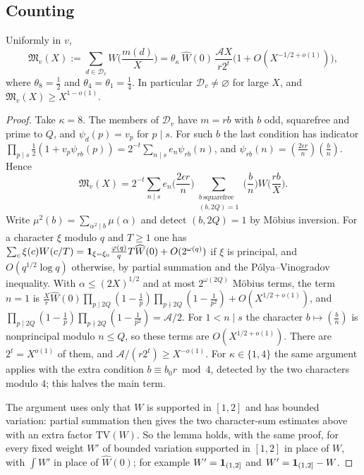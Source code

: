 \documentclass[11pt,colorlinks]{charlie}
\newcommand{\cD}{\mathcal{D}}
\newcommand{\cA}{\mathcal{A}}
\begin{document}
\subsection{Counting}
\begin{lemma}\label{lem:mass}
Uniformly in $v$,
\[
 \mathfrak M_v(X):=\sum_{d\in\cD_v}W\Big(\frac{m(d)}X\Big)=\theta_\kappa\,\widehat W(0)\,\frac{\cA X}{r2^t}\big(1+O(X^{-1/2+o(1)})\big),
\]
where $\theta_8=\frac12$ and $\theta_4=\theta_1=\frac14$.
In particular $\cD_v\ne\varnothing$ for large $X$, and $\mathfrak M_v(X)\ge X^{1-o(1)}$.
\end{lemma}
\begin{proof}
Take $\kappa=8$. The members of $\cD_v$ have $m=rb$ with $b$ odd, squarefree and prime to $Q$, and $\psi_d(p)=v_p$ for $p\mid s$. For such $b$ the last condition has indicator $\prod_{p\mid s}\tfrac12(1+v_p\psi_{rb}(p))=2^{-t}\sum_{n\mid s}e_n\psi_{rb}(n)$, and $\psi_{rb}(n)=(\tfrac{2\epsilon r}{n})(\tfrac bn)$. Hence
\[
 \mathfrak M_v(X)=2^{-t}\sum_{n\mid s}e_n\Big(\frac{2\epsilon r}n\Big)\sum_{\substack{b\ \text{squarefree}\\(b,2Q)=1}}\Big(\frac bn\Big)W\Big(\frac{rb}X\Big).
\]
Write $\mu^2(b)=\sum_{\alpha^2\mid b}\mu(\alpha)$ and detect $(b,2Q)=1$ by M\"obius inversion. For a character $\xi$ modulo $q$ and $T\ge1$ one has $\sum_c\xi(c)W(c/T)=\mathbf{1}_{\xi=\xi_0}\tfrac{\varphi(q)}qT\widehat W(0)+O(2^{\omega(q)})$ if $\xi$ is principal, and $O(q^{1/2}\log q)$ otherwise, by partial summation and the P\'olya--Vinogradov inequality. With $\alpha\le(2X)^{1/2}$ and at most $2^{\omega(2Q)}$ M\"obius terms, the term $n=1$ is $\tfrac Xr\widehat W(0)\prod_{p\mid2Q}(1-\tfrac1p)\prod_{p\nmid2Q}(1-\tfrac1{p^2})+O(X^{1/2+o(1)})$, and $\prod_{p\mid 2Q}(1-\frac1p)\prod_{p\nmid 2Q}(1-\frac1{p^2})=\cA/2$. For $1<n\mid s$ the character $b\mapsto(\tfrac bn)$ is nonprincipal modulo $n\le Q$, so these terms are $O(X^{1/2+o(1)})$. There are $2^t=X^{o(1)}$ of them, and $\cA/(r2^t)\ge X^{-o(1)}$. For $\kappa\in\{1,4\}$ the same argument applies with the extra condition $b\equiv b_0r\bmod4$, detected by the two characters modulo $4$; this halves the main term.

The argument uses only that $W$ is supported in $[1,2]$ and has bounded variation: partial summation then gives the two character-sum estimates above with an extra factor $\mathrm{TV}(W)$. So the lemma holds, with the same proof, for every fixed weight $W'$ of bounded variation supported in $[1,2]$ in place of $W$, with $\int W'$ in place of $\widehat W(0)$; for example $W'=\mathbf{1}_{(1,2]}$ and $W'=\mathbf{1}_{(1,2]}-W$.
\end{proof}
\end{document}

